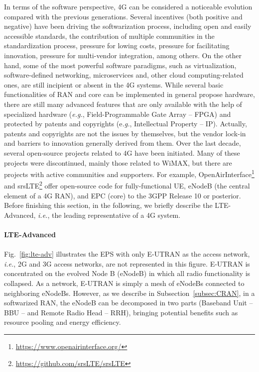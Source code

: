 In terms of the software perspective, 4G can be considered a noticeable evolution compared with the previous generations. Several incentives (both positive and negative) have been driving the softwarization process, including open and easily accessible standards, the contribution of multiple communities in the standardization process, pressure for lowing costs, pressure for facilitating innovation, pressure for multi-vendor integration, among others. On the other hand, some of the most powerful software paradigms, such as virtualization, software-defined networking, microservices and, other cloud computing-related ones, are still incipient or absent in the 4G systems. While several basic functionalities of RAN and core can be implemented in general propose hardware, there are still many advanced features that are only available with the help of specialized hardware (\textit{e.g.}, Field-Programmable Gate Array -- FPGA) and protected by patents and copyrights (e\textit{.g.}, Intellectual Property -- IP). Actually, patents and copyrights are not the issues by themselves, but the vendor lock-in and barriers to innovation generally derived from them. Over the last decade, several open-source projects related to 4G have been initiated. Many of these projects were discontinued, mainly those related to WiMAX, but there are projects with active communities and supporters. For example, OpenAirInterface\footnote{\url{https://www.openairinterface.org/}} and srsLTE\footnote{\url{https://github.com/srsLTE/srsLTE}} offer open-source code for fully-functional UE, eNodeB (the central element of a 4G RAN), and EPC (core) to the 3GPP Release 10 or posterior. Before finishing this section, in the following, we briefly describe the LTE-Advanced, \textit{i.e.}, the leading representative of a 4G system.\\
\\
\textbf{LTE-Advanced}\\
\\
Fig.~\ref{fig:lte-adv} illustrates the EPS with only E-UTRAN as the access network, \textit{i.e.}, 2G and 3G access networks, are not represented in this figure. E-UTRAN is concentrated on the evolved Node B (eNodeB) in which all radio functionality is collapsed. As a network, E-UTRAN is simply a mesh of eNodeBs connected to neighboring eNodeBs. However, as we describe in Subsection~\ref{subsec:CRAN}, in a softwarized RAN, the eNodeB can be decomposed in two parts (Baseband Unit -- BBU -- and Remote Radio Head -- RRH), bringing potential benefits such as resource pooling and energy efficiency. 

